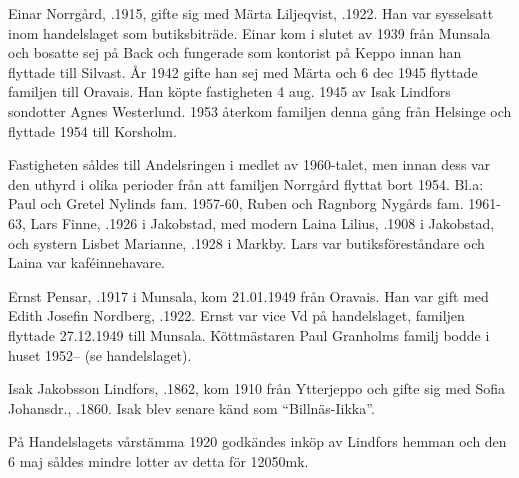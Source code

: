 %
Einar Norrgård, .1915, gifte sig med Märta Liljeqvist, .1922. Han var sysselsatt inom handelslaget som butiksbiträde. Einar kom i slutet av 1939 från Munsala och bosatte sej på Back och fungerade som kontorist på Keppo innan han flyttade till Silvast. År 1942 gifte han sej med Märta och 6 dec 1945 flyttade familjen till Oravais. Han köpte fastigheten 4 aug. 1945 av Isak Lindfors sondotter Agnes Westerlund. 1953 återkom familjen denna gång från Helsinge och flyttade 1954 till Korsholm.
\begin{jhchildren}
  \item {}
  \item {}
  \item {}
\end{jhchildren}

Fastigheten såldes till Andelsringen i medlet av 1960-talet, men innan dess var den uthyrd i olika perioder från att familjen Norrgård flyttat bort 1954. Bl.a: Paul och Gretel Nylinds fam. 1957-60, Ruben och Ragnborg Nygårds fam. 1961-63, Lars Finne, .1926 i Jakobstad, med modern Laina Lilius, .1908 i Jakobstad, och systern Lisbet Marianne, .1928 i Markby. Lars var butiksföreståndare och Laina var kaféinnehavare.

Ernst Pensar, .1917 i Munsala, kom 21.01.1949 från Oravais. Han var gift med Edith Josefin Nordberg, .1922. Ernst var vice Vd på handelslaget, familjen flyttade 27.12.1949 till Munsala. Köttmästaren Paul Granholms familj bodde i huset 1952--  (se handelslaget).


%
Isak Jakobsson Lindfors, .1862, kom 1910 från Ytterjeppo och gifte sig med Sofia Johansdr., .1860. Isak blev senare känd som ``Billnäs-Iikka''.

På Handelslagets vårstämma 1920 godkändes inköp av Lindfors hemman och den 6 maj såldes mindre lotter av detta för 12050mk.


